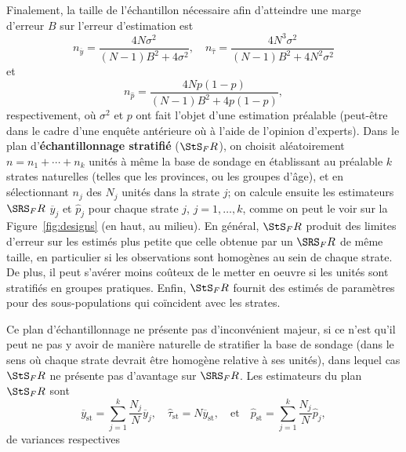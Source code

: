 Finalement, la taille de l'échantillon nécessaire afin d'atteindre une marge d'erreur $B$ sur l'erreur d'estimation est $$n_{\overline{y}}=\frac{4N\sigma^2}{(N-1)B^2+4\sigma^2},\quad n_{\hat{\tau}}=\frac{4N^3\sigma^2}{(N-1)B^2+4N^2\sigma^2}$$ et $$n_{\hat{p}}=\frac{4Np(1-p)}{(N-1)B^2+4p(1-p)},$$ respectivement, o\`u $\sigma^2$ et $p$ ont fait l'objet d'une estimation préalable (peut-\^etre dans le cadre d'une enquête antérieure o\`u \`a l'aide de l'opinion d'experts). \newl 
Dans le plan d'\textbf{échantillonnage  stratifié} ($\StS_FR$), on choisit aléatoirement $n=n_1+\cdots+n_k$ unit\'es \`a m\^eme la base de sondage en établissant au préalable $k$ strates naturelles (telles que les provinces, ou les groupes d'âge), et en sélectionnant $n_j$ des $N_j$ unit\'es dans la strate $j$; on calcule ensuite les estimateurs $\SRS_FR$ $\overline{y}_j$ et $\hat{p}_j$ pour chaque strate $j$, $j=1,\ldots, k$, comme on peut le voir sur la  Figure~\ref{fig:designs} (en haut, au milieu). \newpage\noindent  En g\'en\'eral, $\StS_FR$ produit des limites d'erreur sur les estim\'es plus petite que celle obtenue par un $\SRS_FR$ de même taille, en particulier si les observations sont homog\`enes au sein de chaque strate. De plus, il peut s'av\'erer moins coûteux de le metter en oeuvre si les unit\'es sont stratifiés en groupes pratiques. Enfin, $\StS_FR$ fournit des estim\'es de paramètres pour des sous-populations qui coïncident avec les strates. \par Ce plan d'échantillonnage ne présente pas d'inconvénient majeur, si ce n'est qu'il peut ne pas y avoir de mani\`ere naturelle de stratifier la base de sondage (dans le sens o\`u chaque strate devrait être homogène relative à ses unités), dans lequel cas $\StS_FR$ ne pr\'esente pas d'avantage sur $\SRS_FR$. \newl Les estimateurs du plan  $\StS_FR$ sont  
$$\overline{y}_{\textrm{st}}=\sum_{j=1}^k \frac{N_j}{N}\overline{y}_j, \quad \hat{\tau}_{\textrm{st}}=N\overline{y}_{\textrm{st}}, \quad\mbox{et}\quad \hat{p}_{\textrm{st}}=\sum_{j=1}^k \frac{N_j}{N}\hat{p}_j,$$ de variances respectives 
